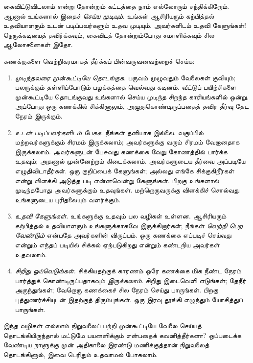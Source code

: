 \documentclass[../../../include/open-logic-section]{subfiles}
\begin{document}

கைவிட்டுவிடலாம் என்று தோன்றும் கட்டத்தை நாம்
எல்லோரும் சந்திக்கிறோம். ஆனால் உங்களால் இதைச்
\emph{செய்ய முடியும்}. உங்கள் ஆசிரியரும் கற்பித்தல்
உதவியாளரும் உடன் படிப்பவர்களும் உதவ முடியும்.
அவர்களிடம் உதவி கேளுங்கள்!{} நெருக்கடியைத் தவிர்க்கவும்,
கைவிடத் தோன்றும்போது சமாளிக்கவும் சில ஆலோசனைகள் இதோ.

கணக்குகளை வெற்றிகரமாகத் தீர்க்கப் பின்வருவனவற்றைச் செய்க:
\begin{enumerate}
\item \emph{முடிந்தவரை முன்கூட்டியே தொடங்குக.}
  பருவம் முழுவதும் வேலைகள் குவியும்; பலருக்கும்
  தள்ளிப்போடும் பழக்கத்தை வெல்வது கடினம். வீட்டுப்
  பயிற்சிகளை முன்கூட்டியே தொடங்குவது உங்களால் செய்ய
  முடிந்த சிறந்த காரியங்களில் ஒன்று. அப்போது ஒரு
  கணக்கில் சிக்கினாலும், அழுதுகொண்டிருப்பதைத் தவிர
  தீர்வு தேட நேரம் இருக்கும்.
\item \emph{உடன் படிப்பவர்களிடம் பேசுக}. நீங்கள்
  தனியாக இல்லை. வகுப்பில் மற்றவர்களுக்கும் சிரமம்
  இருக்கலாம்; அவர்களுக்கு வரும் சிரமம் வேறானதாக
  இருக்கலாம். அவர்களுடன் பேசுவது கணக்கை வேறு
  கோணத்தில் பார்க்க உதவும்; அதனால் முன்னேற்றம்
  கிடைக்கலாம். அவர்களுடைய தீர்வை அப்படியே
  எழுதிவிடாதீர்கள். ஒரு குறிப்பைக் கேளுங்கள்;
  அல்லது எங்கே சிக்குகிறீர்கள் என்று விளக்கி
  அடுத்த படி என்னவென்று கேளுங்கள். பிறகு உங்களால்
  முடிந்தபோது அவர்களுக்கும் உதவுங்கள். மற்றொருவருக்கு
  விளக்கிச் சொல்வது உங்களுடைய புரிதலையும் வளர்க்கும்.
\item \emph{உதவி கேளுங்கள்.} உங்களுக்கு உதவும்
  பல வழிகள் உள்ளன. ஆசிரியரும் கற்பித்தல் உதவியாளரும்
  உங்களுக்காகவே இருக்கிறார்கள்; நீங்கள் \emph{வெற்றி
  பெற வேண்டும்} என்பதே அவர்களின் விருப்பம். ஒரு
  கணக்கை எப்படிச் செய்வது என்றும் எந்தப் படியில்
  சிக்கல் ஏற்படுகிறது என்றும் கண்டறிய அவர்கள் உதவலாம்.
\item \emph{சிறிது ஓய்வெடுங்கள்.} சிக்கியதற்குக்
  காரணம் ஒரே கணக்கை மிக நீண்ட நேரம் பார்த்துக்
  கொண்டிருப்பதாகவும் \emph{இருக்கலாம்}. சிறிது
  இடைவெளி எடுங்கள்; தேநீர் அருந்துங்கள்; வேறொரு
  கணக்கைச் சில நேரம் செய்து பாருங்கள். பிறகு
  புத்துணர்ச்சியுடன் இதற்குத் திரும்புங்கள். ஒரு
  இரவு தூங்கி எழுந்தும் யோசித்துப் பாருங்கள்.
\end{enumerate}

இந்த வழிகள் எல்லாம் நிறுவலைப் பற்றி முன்கூட்டியே
வேலை செய்யத் தொடங்கியிருந்தால் மட்டுமே பயனளிக்கும்
என்பதைக் கவனித்தீர்களா? ஒப்படைக்க வேண்டிய நாளுக்கு
முன் அதிகாலை இரண்டு மணிக்குத்தான் நிறுவலைத்
தொடங்கினால், இவை பெரிதும் உதவாமல் போகலாம்.
\end{document}
